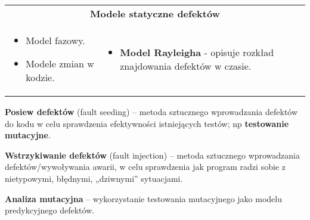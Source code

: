 \documentclass[../main.tex]{subfiles}
\begin{document}
    \begin{table}[H]
        \begin{center}
            \begin{tabular}{p{8cm} p{8cm}}
                \multicolumn{2}{c}{\textbf{Modele statyczne defektów}}\\
                \begin{itemize}
                    \item Model fazowy.
                    \item Modele zmian w kodzie.
                \end{itemize}
                &
                \begin{itemize}
                    \item \textbf{Model Rayleigha} - opisuje rozkład znajdowania defektów w czasie.
                \end{itemize}
            \end{tabular}
        \end{center}
    \end{table}


    \textbf{Posiew defektów} (fault seeding) – metoda sztucznego wprowadzania defektów do kodu w
    celu sprawdzenia efektywności istniejących testów; np \textbf{testowanie mutacyjne}.

    \textbf{Wstrzykiwanie defektów} (fault injection) – metoda sztucznego wprowadzania defektów/wywoływania
    awarii, w celu sprawdzenia jak program radzi sobie z nietypowymi, błędnymi, „dziwnymi” sytuacjami.

    \textbf{Analiza mutacyjna} – wykorzystanie testowania mutacyjnego jako modelu predykcyjnego defektów.
\end{document}

